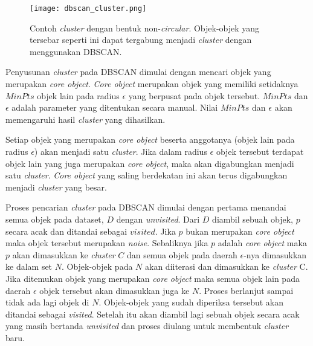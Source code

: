 \begin{figure}[H]
	\centering
	\texttt{[image: dbscan\_cluster.png]}
	\caption{Contoh \textit{cluster} dengan bentuk non-\textit{circular}. Objek-objek yang tersebar seperti ini dapat tergabung menjadi \textit{cluster} dengan menggunakan DBSCAN.}
	\label{fig:dbscan_cluster}
\end{figure}

Penyusunan \textit{cluster} pada DBSCAN dimulai dengan mencari objek yang merupakan \textit{core object}. \textit{Core object} merupakan objek yang memiliki setidaknya $MinPts$ objek lain pada radius $\epsilon$ yang berpusat pada objek tersebut. $MinPts$ dan $\epsilon$ adalah parameter yang ditentukan secara manual. Nilai $MinPts$ dan $\epsilon$ akan memengaruhi hasil \textit{cluster} yang dihasilkan.

Setiap objek yang merupakan \textit{core object} beserta anggotanya (objek lain pada radius $\epsilon$) akan menjadi satu \textit{cluster}. Jika dalam radius $\epsilon$ objek tersebut terdapat objek lain yang juga merupakan \textit{core object}, maka akan digabungkan menjadi satu \textit{cluster}. \textit{Core object} yang saling berdekatan ini akan terus digabungkan menjadi \textit{cluster} yang besar.

Proses pencarian \textit{cluster} pada DBSCAN dimulai dengan pertama menandai semua objek pada dataset, $D$ dengan \textit{unvisited}. Dari $D$ diambil sebuah objek, $p$ secara acak dan ditandai sebagai $visited$. Jika $p$ bukan merupakan \textit{core object} maka objek tersebut merupakan \textit{noise}. Sebaliknya jika $p$ adalah \textit{core object} maka $p$ akan dimasukkan ke \textit{cluster} $C$ dan semua objek pada daerah $\epsilon$-nya dimasukkan ke dalam set $N$. Objek-objek pada $N$ akan diiterasi dan dimasukkan ke \textit{cluster} C. Jika ditemukan objek yang merupakan \textit{core object} maka semua objek lain pada daerah $\epsilon$ objek tersebut akan dimasukkan juga ke $N$. Proses berlanjut sampai tidak ada lagi objek di $N$. Objek-objek yang sudah diperiksa tersebut akan ditandai sebagai \textit{visited}. Setelah itu akan diambil lagi sebuah objek secara acak yang masih bertanda \textit{unvisited} dan proses diulang untuk membentuk \textit{cluster} baru.

